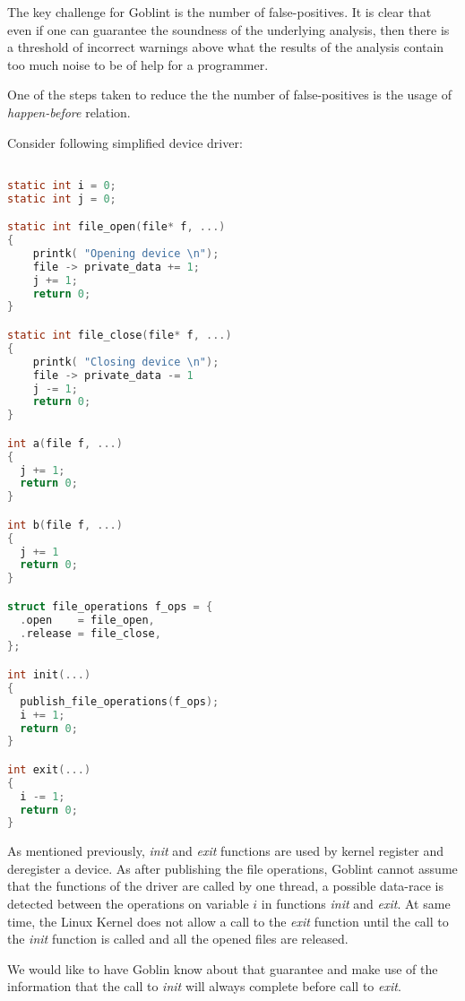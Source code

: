 \documentclass[..thesis.tex]{subfiles}
\begin{document}

The key challenge for Goblint is the number of false-positives. It is clear that even if one can guarantee the soundness of the 
underlying analysis, then there is a threshold of incorrect warnings above what the results of the analysis contain too much noise
to be of help for a programmer.


One of the steps taken to reduce the the number of false-positives is the usage of \textit{happen-before} relation.


Consider following simplified device driver:

\begin{lstlisting}[language=c,style=def]

static int i = 0;
static int j = 0;

static int file_open(file* f, ...)
{
    printk( "Opening device \n");
    file -> private_data += 1;
    j += 1;
    return 0;
}

static int file_close(file* f, ...)
{
    printk( "Closing device \n");
    file -> private_data -= 1
    j -= 1;
    return 0;
}

int a(file f, ...)
{
  j += 1;
  return 0;
}

int b(file f, ...)
{
  j += 1
  return 0;
}

struct file_operations f_ops = {
  .open    = file_open,
  .release = file_close,
};

int init(...)
{
  publish_file_operations(f_ops);
  i += 1;
  return 0;
}

int exit(...)
{
  i -= 1;
  return 0;
}

\end{lstlisting}

As mentioned previously, \textit{init} and \textit{exit} functions are used by kernel register and deregister a device.
 As after publishing the file operations, Goblint cannot assume that the functions of the driver are called by one thread,
 a possible data-race is detected between the operations on variable $i$ in functions \textit{init} and \textit{exit}.
 At same time, the Linux Kernel does not allow a call to the \textit{exit} function until the call to the \textit{init} function is called and all the opened files are released.

We would like to have Goblin know about that guarantee and make use of the information that the call to \textit{init} will always complete before call to \textit{exit}.
\end{document}
